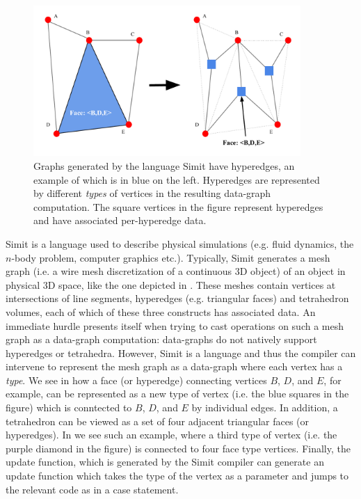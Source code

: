 \subsection{}

\begin{figure}[h]
\centering
\includegraphics[width=4in]{hyperedge.pdf}
\caption{Graphs generated by the language Simit have hyperedges, an example
of which is in blue on the left.  Hyperedges are represented by different
\emph{types} of vertices in the resulting data-graph computation.
The square vertices in the figure represent hyperedges and have associated
per-hyperedge data.}
\label{fig:hyperedge}
\end{figure}


Simit is a language used to describe physical simulations 
(e.g. fluid dynamics, the $n$-body problem, computer graphics etc.).
Typically, Simit generates a mesh graph (i.e. a wire mesh discretization
of a continuous 3D object) of an object in 
physical 3D space, like the one depicted in .  
These meshes contain vertices at intersections of line segments, 
hyperedges (e.g. triangular faces) and tetrahedron volumes, each of which of
these three constructs has associated data.  An immediate hurdle
presents itself when trying to cast operations on such a mesh graph
as a data-graph computation: data-graphs do not natively support
hyperedges or tetrahedra.  However, Simit is a language and thus
the compiler can intervene to represent the mesh graph as a data-graph
where each vertex has a \emph{type}.  We see in 
how a face (or hyperedge) connecting vertices $B$, $D$, and $E$, for example, 
can be represented as a new type of vertex (i.e. the blue squares
in the figure) which is conntected to $B$, $D$, and
$E$ by individual edges.  In addition, a tetrahedron can be 
viewed as a set of four adjacent triangular faces (or hyperedges).  In 
 we see such an example, where a third type
of vertex (i.e. the purple diamond in the figure) is connected 
to four face type vertices.  Finally, the update function, which
is generated by the Simit compiler can generate an update function
which takes the type of the vertex as a parameter and jumps
to the relevant code as in a case statement.



